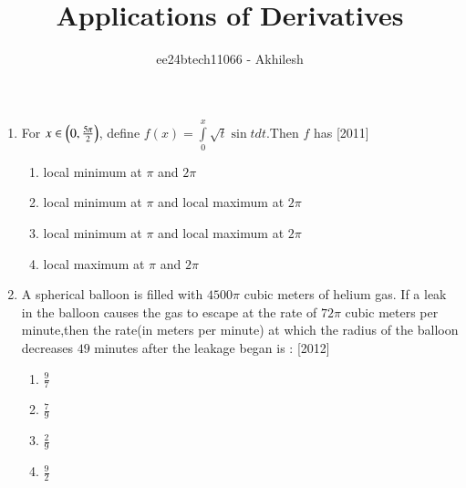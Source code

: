 \documentclass[journal,12pt,twocolumn]{IEEEtran}
\theoremstyle{remark}
\begin{document}

\vspace{3cm}

\title{Applications of Derivatives}
\author{ee24btech11066 - Akhilesh}
\maketitle
\newpage
\bigskip

\renewcommand{\thefigure}{\theenumi}
\renewcommand{\thetable}{\theenumi}
\begin{enumerate}
\item For $x \in \left(0,\frac{5\pi}{2}\right)$, define $f(x)=\int\limits_0^x\sqrt{t}\sin t dt$.Then $f$ has \hfill{[2011]}\\
\begin{enumerate}
    \item   local minimum at $\pi$ and $2\pi$\\
    \item   local minimum at $\pi$ and local maximum at $2\pi$
    \item   local minimum at $\pi$ and local maximum at $2\pi$
    \item   local maximum at $\pi$ and $2\pi$\\
\end{enumerate}
    
\item A spherical balloon is filled with $4500\pi$ cubic meters of helium gas. If a leak in the balloon causes the gas to escape at the rate of $72\pi$ cubic meters per minute,then the rate{(in meters per minute)} at which the radius of the balloon decreases $49$ minutes after the leakage began is : \hfill{[2012]}\\
\begin{enumerate}
    \item   $\frac{9}{7}$\\
    \item   $\frac{7}{9}$\\
    \item   $\frac{2}{9}$\\
    \item   $\frac{9}{2}$\\
\end{enumerate} 


\end{enumerate}
\end{document}
